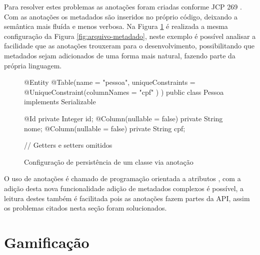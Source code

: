 \par Para resolver estes problemas as anotações foram criadas conforme JCP 269 . Com as anotações os metadados são inseridos no próprio código, deixando a semântica mais fluída e menos verbosa. Na Figura \ref{fig:classe-metadado} é realizada a mesma configuração da Figura \ref{fig:arquivo-metadado}, neste exemplo é possível analisar a facilidade que as anotações trouxeram para o desenvolvimento, possibilitando que metadados sejam adicionados de uma forma mais natural, fazendo parte da própria linguagem.

\begin{figure}[H]
    \centering
    \begin{java}
@Entity
@Table(name = "pessoa", uniqueConstraints = { @UniqueConstraint(columnNames = { "cpf" }) 
})
public class Pessoa implements Serializable {

	@Id
	private Integer id;
	@Column(nullable = false)
	private String nome;
	@Column(nullable = false)
	private String cpf;

    // Getters e setters omitidos

}
    \end{java}
    \caption{Configuração de persistência de um classe via anotação}
    \label{fig:classe-metadado}
\end{figure}

O uso de anotações é chamado de programação orientada a atributos \cite{buschmann2007pattern}, com a adição desta nova funcionalidade adição de metadados complexos é possível, a leitura destes também é facilitada pois as anotações fazem partes da API, assim os problemas citados nesta seção foram solucionados.

\section{Gamificação}


